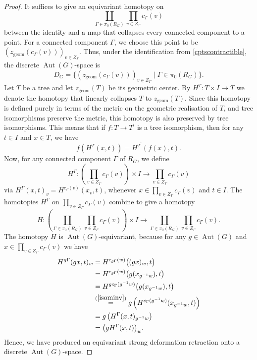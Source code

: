 \documentclass[reqno,dvipsnames]{amsart}
\theoremstyle{plain}
\numberwithin{equation}{section}
\theoremstyle{definition}
\DeclareMathOperator{\Aut}{Aut}
\begin{document}
\begin{proof}
	It suffices to give an equivariant homotopy on 
	\[
	\coprod_{\Gamma\in \pi_0(R_G)}\prod_{v\in Z_\Gamma} c_\Gamma(v)
	\]
	between the identity and a map that collapses every connected component to a point. For a connected component $\Gamma$, we choose this point to be $(z_\mathrm{geom}(c_\Gamma(v)))_{v\in Z_\Gamma}$. Thus, under the identification from \autoref{cptscontractible}, the discrete $\Aut(G)$-space is 
	\[
	D_G = \{(z_\mathrm{geom}(c_\Gamma(v)))_{v\in Z_\Gamma}\mid \Gamma \in \pi_0(R_G)\}.
	\]
	Let $T$ be a tree and let $z_\mathrm{geom}(T)$ be its geometric center. By $H^T\colon T\times I\to T$ we denote the homotopy that linearly collapses $T$ to $z_\mathrm{geom}(T)$. Since this homotopy is defined purely in terms of the metric on the geometric realisation of $T$, and tree isomorphisms preserve the metric, this homotopy is also preserved by tree isomorphisms. This means that if $f\colon T\to T^\prime$ is a tree isomorphism, then for any $t\in I$ and $x\in T$, we have 
	\begin{equation}
		\label{isominv}
		f(H^T(x,t)) = H^{T^\prime}(f(x), t).
	\end{equation}
	Now, for any connected component $\Gamma$ of $R_G$, we define 
	\[
	H^\Gamma \colon \left(\prod_{v\in Z_\Gamma} c_\Gamma(v) \right)\times I\to \prod_{v\in Z_\Gamma} c_\Gamma(v)
	\]
	via $H^\Gamma(x,t)_v = H^{c_\Gamma(v)}(x_v,t)$, whenever $x\in \prod_{v\in Z_\Gamma} c_\Gamma(v)$ and $t\in I$. The homotopies $H^\Gamma$ on $\prod_{v\in Z_\Gamma} c_\Gamma(v)$ combine to give a homotopy
	\[
	H\colon \left(\coprod_{\Gamma\in \pi_0(R_G)}\prod_{v\in Z_\Gamma} c_\Gamma(v)\right)\times I \to \coprod_{\Gamma\in \pi_0(R_G)}\prod_{v\in Z_\Gamma} c_\Gamma(v).
	\]
	The homotopy $H$ is $\Aut(G)$-equivariant, because for any $g\in \Aut(G)$ and $x\in\prod_{v\in Z_\Gamma} c_\Gamma(v)$ we have
	\[
	\begin{aligned}
		H^{g\Gamma} (gx,t)_w
		&= H^{c_{g\Gamma}(w)}\bigl((gx)_w,t\bigr) \\
		&= H^{c_{g\Gamma}(w)}\bigl(g(x_{g^{-1}w}),t\bigr) \\
		&= H^{g c_\Gamma(g^{-1}w)}\bigl(g(x_{g^{-1}w}),t\bigr) \\
		&\overset{(\ref{isominv})}{=} g\left(H^{c_\Gamma(g^{-1}w)}(x_{g^{-1}w},t)\right) \\
		&= g\left(H^\Gamma(x,t)_{g^{-1}w}\right) \\
		&= \bigl(gH^\Gamma(x,t)\bigr)_w.
	\end{aligned}
	\]
	Hence, we have produced an equivariant strong deformation retraction onto a discrete $\Aut(G)$-space.
\end{proof}
\end{document}
